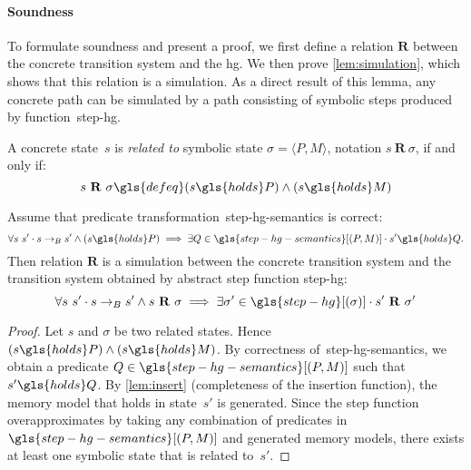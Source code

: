\paragraph{Soundness}
To formulate soundness and present a proof, we first define a relation $\mathbf{R}$
between the concrete transition system and the \ac{hg}.
We then prove \cref{lem:simulation}, which shows that this relation is a simulation.
As a direct result of this lemma, any concrete path can be simulated by a path consisting of symbolic steps produced by function~\gls{step-hg}.

\begin{definition}
  A concrete state~$s$ is \emph{related to} symbolic state $\sigma = \langle P,M \rangle$, notation $s~\mathbf{R}~\sigma$, if and only if:
  \begin{equation*}
    s~\mathbf{R}~\sigma \gls{defeq} (s\gls{holds}P) \wedge (s\gls{holds}M)
  \end{equation*}
\end{definition}

\begin{lemma}\label{lem:simulation}
  Assume that predicate transformation~\gls{step-hg-semantics} is correct:
  \begin{equation*}
    \forall s~s' \sepdot s \rightarrow_B s' \wedge (s\gls{holds}P) \implies \exists Q\in\gls{step-hg-semantics}[(P,M)] \sepdot s'\gls{holds}Q.
  \end{equation*}
  Then relation $\mathbf{R}$ is a simulation between the concrete transition system and the transition system obtained by abstract step function \gls{step-hg}:
  \begin{equation*}
    \forall s~s' \sepdot s \rightarrow_B s' \wedge s~\mathbf{R}~\sigma \implies \exists \sigma' \in \gls{step-hg}[(\sigma)] \sepdot s'~\mathbf{R}~\sigma'
  \end{equation*}
\end{lemma}
\begin{proof}
  Let $s$ and $\sigma$ be two related states.
  Hence $(s\gls{holds}P) \wedge (s\gls{holds}M)$.
  By correctness of~\gls{step-hg-semantics}, we obtain a predicate $Q\in\gls{step-hg-semantics}[(P,M)]$ such that $s'\gls{holds}Q$.
  By \cref{lem:insert} (completeness of the insertion function), the memory model that holds in state~$s'$ is generated.
  Since the step function overapproximates by taking any combination of predicates in $\gls{step-hg-semantics}[(P,M)]$ and generated memory models, there exists at least one symbolic state that is related to~$s'$.
\end{proof}

